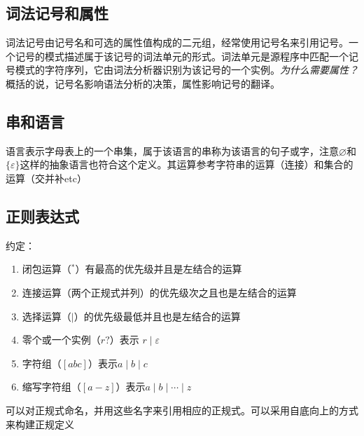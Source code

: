 \documentclass[]{report}
\begin{document}
		\subsection{词法记号和属性}
		词法记号由记号名和可选的属性值构成的二元组，经常使用记号名来引用记号。一个记号的模式描述属于该记号的词法单元的形式。词法单元是源程序中匹配一个记号模式的字符序列，它由词法分析器识别为该记号的一个实例。\textit{为什么需要属性？}概括的说，记号名影响语法分析的决策，属性影响记号的翻译。
		\subsection{串和语言}
		语言表示字母表上的一个串集，属于该语言的串称为该语言的句子或字，注意$\varnothing$和$\{\varepsilon\}$这样的抽象语言也符合这个定义。其运算参考字符串的运算（连接）和集合的运算（交并补etc）
		\subsection{正则表达式}
		约定：
		\begin{enumerate}
			\item 闭包运算（$^*$）有最高的优先级并且是左结合的运算
			\item 连接运算（两个正规式并列）的优先级次之且也是左结合的运算
			\item 选择运算（$\mid$）的优先级最低并且也是左结合的运算
			\item 零个或一个实例（$r?$）表示 $r\mid\varepsilon$
			\item 字符组（$[abc]$）表示$a\mid b\mid c$
			\item 缩写字符组（$[a-z]$）表示$a\mid b\mid\cdots\mid z$
		\end{enumerate}\par
		可以对正规式命名，并用这些名字来引用相应的正规式。可以采用自底向上的方式来构建正规定义
\end{document}
